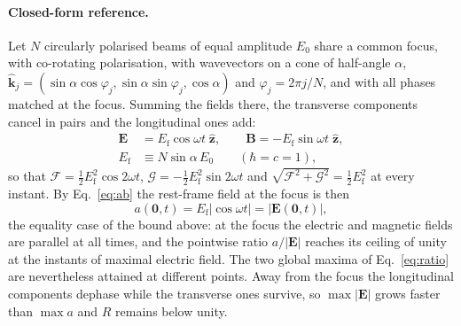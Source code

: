 \documentclass[aps,prd,reprint,superscriptaddress,nofootinbib,floatfix]{revtex4-2}
\begin{document}
\paragraph{Closed-form reference.} Let $N$ circularly polarised beams of equal
amplitude $E_0$ share a common focus, with co-rotating polarisation, with
wavevectors on a cone of half-angle $\alpha$,
$\hat{\mathbf{k}}_j=(\sin\alpha\cos\varphi_j,\sin\alpha\sin\varphi_j,\cos\alpha)$
and $\varphi_j=2\pi j/N$, and with all phases matched at the focus. Summing
the fields there, the transverse components cancel in pairs and the
longitudinal ones add:
\begin{equation}
\begin{split}
\mathbf{E}&=E_{\mathrm{f}}\cos\omega t\;\hat{\mathbf{z}},\qquad
\mathbf{B}=-E_{\mathrm{f}}\sin\omega t\;\hat{\mathbf{z}},\\
E_{\mathrm{f}}&\equiv N\sin\alpha\,E_0\qquad(\hbar=c=1),
\end{split}
\label{eq:focus_cone}
\end{equation}
so that $\mathcal{F}=\tfrac12E_{\mathrm{f}}^2\cos2\omega t$,
$\mathcal{G}=-\tfrac12E_{\mathrm{f}}^2\sin2\omega t$ and
$\sqrt{\mathcal{F}^2+\mathcal{G}^2}=\tfrac12E_{\mathrm{f}}^2$ at every
instant. By Eq.~\eqref{eq:ab} the rest-frame field at the focus is then
\begin{equation}
a(\mathbf{0},t)=E_{\mathrm{f}}\left|\cos\omega t\right|
=\left|\mathbf{E}(\mathbf{0},t)\right|,
\label{eq:focus_a}
\end{equation}
the equality case of the bound above: at the focus the electric and magnetic
fields are parallel at all times, and the pointwise ratio $a/|\mathbf{E}|$
reaches its ceiling of unity at the instants of maximal electric field. The
two global maxima of Eq.~\eqref{eq:ratio} are nevertheless attained at
different points. Away from the focus the longitudinal components dephase
while the transverse ones survive, so $\max|\mathbf{E}|$ grows faster than
$\max a$ and $R$ remains below unity.
\end{document}
